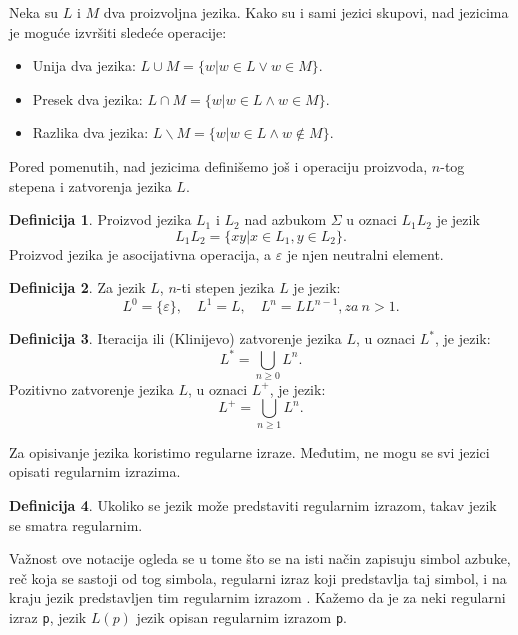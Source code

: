 \documentclass[12pt,oneside]{memoir}
\theoremstyle{plain}
\theoremstyle{definition}
\newtheorem{defn}{Definicija} %
\begin{document}
Neka su $L$ i $M$ dva proizvoljna jezika. Kako su i sami jezici skupovi, nad jezicima je moguće izvršiti sledeće operacije:
\begin{itemize}
\item Unija dva jezika: $L \cup M = \{w| w \in L \vee w\in M \}$.
\item Presek dva jezika: $L \cap M = \{w| w \in L \wedge w\in M \}$.
\item Razlika dva jezika: $L \backslash M = \{w| w \in L \wedge w\notin M \}$.
\end{itemize}
 Pored pomenutih, nad jezicima definišemo još i operaciju proizvoda, $n$-tog stepena i zatvorenja jezika $L$.
\begin{defn}
Proizvod jezika $L_1$ i $L_2$ nad azbukom $\Sigma$ u oznaci $L_1L_2$ je jezik $$L_1L_2 = \{xy | x \in L_1, y \in L_2\}.$$
Proizvod jezika je asocijativna operacija, a {$\varepsilon$} je njen neutralni element.
\end{defn}

\begin{defn}
Za jezik $L$, $n$-ti stepen jezika $L$ je jezik: 
$$L^0 = \{ \varepsilon\},\quad L^1 = L,\quad L^n = LL^{n-1}, za\  n>1.$$ 
\end{defn}

\begin{defn}
Iteracija ili (Klinijevo) zatvorenje jezika $L$, u oznaci $L^*$, je jezik:
$$ L^* = \bigcup_{n\geq0}L^n.$$
Pozitivno zatvorenje jezika $L$, u oznaci $L^+$, je jezik:
$$ L^+ = \bigcup_{n\geq1}L^n.$$
\end{defn}

Za opisivanje jezika koristimo regularne izraze. Međutim, ne mogu se svi jezici opisati regularnim izrazima. 

\begin{defn}
Ukoliko se jezik može predstaviti regularnim izrazom, takav jezik se smatra regularnim.
\end{defn}

Važnost ove notacije ogleda se u tome što se na isti način zapisuju simbol azbuke, reč koja se sastoji od tog simbola, regularni izraz koji predstavlja taj simbol, i na kraju jezik predstavljen tim regularnim izrazom \cite{Vitas}. Kažemo da je za neki regularni izraz \texttt{p}, jezik $L(p)$ jezik opisan regularnim izrazom \texttt{p}.
\end{document}
